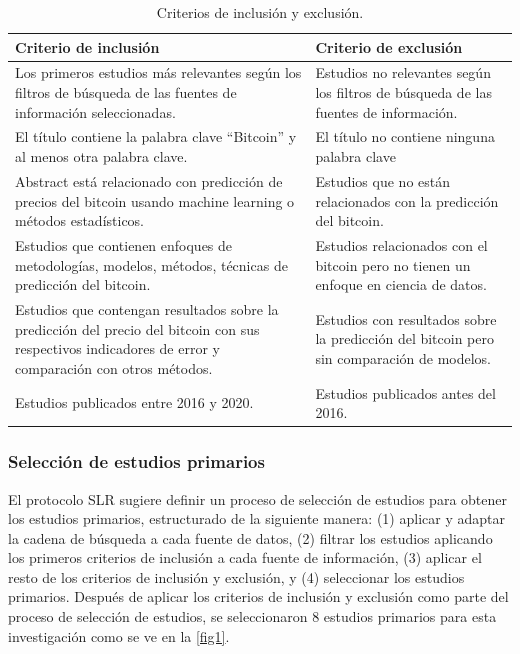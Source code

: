 \begin{table}[h!]
	\centering
	\begin{tabular}{ | m{7cm}| m{7cm} | }
		\hline
		\textbf{Criterio de inclusión} & \textbf{Criterio de exclusión}\\
		\hline
		
		Los primeros estudios más relevantes según los filtros de búsqueda de las fuentes de información seleccionadas.& Estudios no relevantes según los filtros de búsqueda de las fuentes de información.\\
		
		\hline
		El título contiene la palabra clave ``Bitcoin'' y al menos otra palabra clave. &  El título no contiene ninguna palabra clave\\ 
		\hline
		Abstract está relacionado con predicción de precios del bitcoin usando machine learning o métodos estadísticos. & Estudios que no están relacionados con la predicción del
		bitcoin.\\
		\hline
		Estudios que contienen enfoques de metodologías, modelos, métodos, técnicas de predicción del bitcoin. & Estudios relacionados con el bitcoin pero no tienen un
		enfoque en ciencia de datos.\\
		\hline
		Estudios que contengan resultados sobre la predicción del precio del bitcoin con sus respectivos indicadores de error y comparación con otros métodos. & Estudios con resultados sobre la predicción del bitcoin pero sin comparación de modelos.\\
		\hline
		Estudios publicados entre 2016 y 2020. & Estudios publicados antes del 2016.\\
		\hline
	\end{tabular}
	\caption{Criterios de inclusión y exclusión.}
	\label{tab:Table1}
\end{table}

\subsubsection{Selección de estudios primarios}
El protocolo SLR \parencite{kitchenhamSystematicLiteratureReviews2009} sugiere definir un proceso de selección de estudios para obtener los estudios primarios, estructurado de la siguiente manera: (1) aplicar y adaptar la cadena de búsqueda a cada fuente de datos, (2) filtrar los estudios aplicando los primeros criterios de inclusión a cada fuente de información, (3) aplicar el resto de los criterios de inclusión y exclusión, y (4) seleccionar los estudios primarios. Después de aplicar los criterios de inclusión y exclusión como parte del proceso de selección de estudios, se seleccionaron 8 estudios primarios para esta investigación como se ve en la \cref{fig1}.\\

